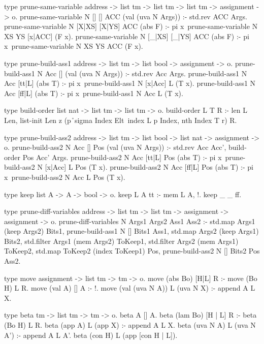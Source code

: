 \begin{elpicode}
  type prune-same-variable address -> list tm -> list tm -> 
                            list tm -> assignment -> o.
  prune-same-variable N [] [] ACC (val (uva N Args)) :- 
    std.rev ACC Args.
  prune-same-variable N [X|XS] [X|YS] ACC (abs F) :- 
    pi x\ prune-same-variable N XS YS [x|ACC] (F x).
  prune-same-variable N [_|XS] [_|YS] ACC (abs F) :- 
    pi x\ prune-same-variable N XS YS ACC (F x).

  type prune-build-ass1 address -> list tm -> 
                        list bool -> assignment -> o.
  prune-build-ass1 N Acc [] (val (uva N Args)) :- 
    std.rev Acc Args.
  prune-build-ass1 N Acc [tt|L] (abs T) :- 
    pi x\ prune-build-ass1 N [x|Acc] L (T x).
  prune-build-ass1 N Acc [ff|L] (abs T) :- 
    pi x\ prune-build-ass1 N Acc L (T x).

  type build-order list nat -> list tm -> list tm -> o.
  build-order L T R :-
    len L Len, list-init Len z 
      (p\r\ sigma Index Elt\ index L p Index, nth Index T r) R.

  type prune-build-ass2 address -> list tm -> list bool -> 
                      list nat -> assignment -> o.
  prune-build-ass2 N Acc [] Pos (val (uva N Args)) :- 
    std.rev Acc Acc', build-order Pos Acc' Args.
  prune-build-ass2 N Acc [tt|L] Pos (abs T) :- 
    pi x\ prune-build-ass2 N [x|Acc] L Pos (T x).
  prune-build-ass2 N Acc [ff|L] Pos (abs T) :- 
    pi x\ prune-build-ass2 N Acc L Pos (T x).

  type keep list A -> A -> bool -> o.
  keep L A tt :- mem L A, !.
  keep _ _ ff.

  type prune-diff-variables address -> list tm -> list tm -> 
                            assignment -> assignment -> o.
  prune-diff-variables N Args1 Args2 Ass1 Ass2 :-
    std.map Args1 (keep Args2) Bits1, 
    prune-build-ass1 N [] Bits1 Ass1,
    std.map Args2 (keep Args1) Bits2, 
    std.filter Args1 (mem Args2) ToKeep1,
    std.filter Args2 (mem Args1) ToKeep2,
    std.map ToKeep2 (index ToKeep1) Pos,
    prune-build-ass2 N [] Bits2 Pos Ass2.

  type move assignment -> list tm -> tm -> o.
  move (abs Bo)        [H|L] R :- move (Bo H) L R.
  move (val A)         []    A :- !.
  move (val (uva N A)) L     (uva N X) :- append A L X.

  type beta tm -> list tm -> tm -> o.
  beta A [] A.
  beta (lam Bo) [H | L] R :- beta (Bo H) L R.
  beta (app A) L (app X) :- append A L X.
  beta (uva N A) L (uva N A') :- append A L A'.
  beta (con H) L (app [con H | L]).


\end{elpicode}
